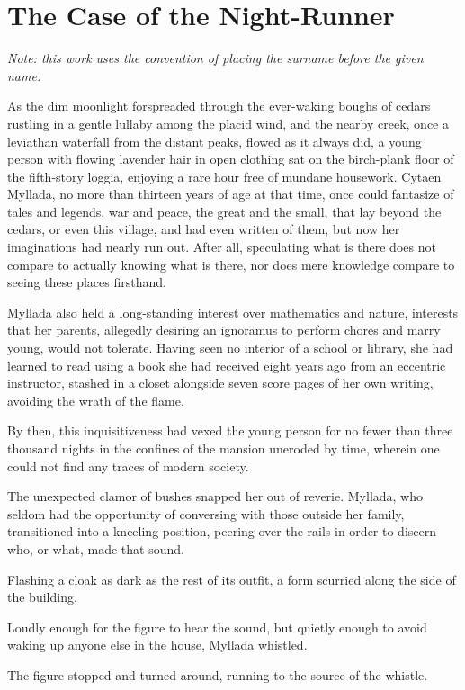 \chapter{The Case of the Night-Runner}

\emph{Note: this work uses the convention of placing the surname before the given name.}

As the dim moonlight forspreaded through the ever-waking boughs of cedars rustling in a gentle lullaby among the placid wind, and the nearby creek, once a leviathan waterfall from the distant peaks, flowed as it always did, a young person with flowing lavender hair in open clothing sat on the birch-plank floor of the fifth-story loggia, enjoying a rare hour free of mundane housework. Cytaen Myllada, no more than thirteen years of age at that time, once could fantasize of tales and legends, war and peace, the great and the small, that lay beyond the cedars, or even this village, and had even written of them, but now her imaginations had nearly run out. After all, speculating what is there does not compare to actually knowing what is there, nor does mere knowledge compare to seeing these places firsthand.

Myllada also held a long-standing interest over mathematics and nature, interests that her parents, allegedly desiring an ignoramus to perform chores and marry young, would not tolerate. Having seen no interior of a school or library, she had learned to read using a book she had received eight years ago from an eccentric instructor, stashed in a closet alongside seven score pages of her own writing, avoiding the wrath of the flame.

By then, this inquisitiveness had vexed the young person for no fewer than three thousand nights in the confines of the mansion uneroded by time, wherein one could not find any traces of modern society.

The unexpected clamor of bushes snapped her out of reverie. Myllada, who seldom had the opportunity of conversing with those outside her family, transitioned into a kneeling position, peering over the rails in order to discern who, or what, made that sound.

Flashing a cloak as dark as the rest of its outfit, a form scurried along the side of the building.

Loudly enough for the figure to hear the sound, but quietly enough to avoid waking up anyone else in the house, Myllada whistled.

The figure stopped and turned around, running to the source of the whistle.

